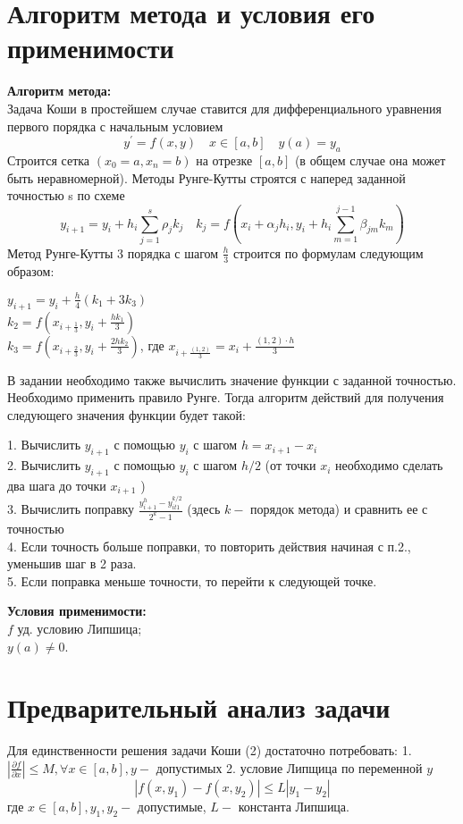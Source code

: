 \documentclass[12pt]{article}
\begin{document}
\section{Алгоритм метода и условия его применимости} 
\textbf{Алгоритм метода:} \\ 
Задача Коши в простейшем случае ставится для дифференциального уравнения первого порядка с начальным условием
$$
y^{\prime}=f(x, y) \quad x \in[a, b] \quad y(a)=y_{a}
$$
Строится сетка $\left(x_{0}=a, x_{n}=b\right)$ на отрезке $[a, b]$ (в общем случае она может быть неравномерной). Методы Рунге-Кутты строятся с наперед заданной точностью s по схеме
$$
y_{i+1}=y_{i}+h_{i} \sum_{j=1}^{s} \rho_{j} k_{j} \quad k_{j}=f\left(x_{i}+\alpha_{j} h_{i}, y_{i}+h_{i} \sum_{m=1}^{j-1} \beta_{j m} k_{m}\right)
$$
Метод Рунге-Кутты 3 порядка с шагом $\frac{h}{3}$ строится по формулам следующим образом:\\
\begin{center}
$y_{i+1}=y_{i}+\frac{h}{4}(k_1 + 3k_3)$\\
$k_{2}=f\left(x_{i+\frac{1}{3}}, y_{i}+\frac{h k_{1}}{3}\right)$\\
$k_{3}=f\left(x_{i+\frac{2}{3}}, y_{i}+\frac{2 h k_{2}}{3}\right)$, где $x_{i+\frac{(1,2)}{3}} = x_i + \frac{{(1,2)}\cdot h }{3}$

\end{center}
В задании необходимо также вычислить значение функции с заданной точностью. Необходимо применить правило Рунге. Тогда алгоритм действий для получения следующего значения функции будет такой:
\begin{flushleft}
1. Вычислить $y_{i+1}$ с помощью $y_{i}$ с шагом $h=x_{i+1}-x_{i}$\\
2. Вычислить $y_{i+1}$ с помощью $y_{i}$ с шагом $h / 2$ (от точки $x_{i}$ необходимо сделать два шага до точки $x_{i+1}$ )\\
3. Вычислить поправку $\frac{y_{i+1}^{h}-y_{i t 1}^{k / 2}}{2^{k}-1}$ (здесь $k-$ порядок метода) и сравнить ее с точностью\\
4. Если точность больше поправки, то повторить действия начиная с п.2., уменьшив шаг в 2 раза.\\
5. Если поправка меньше точности, то перейти к следующей точке.
\end{flushleft}
\textbf{Условия применимости:}\\
$f$ уд. условию Липшица;\\
$y(a) \neq 0$.
\section{Предварительный анализ задачи}
Для единственности решения задачи Коши (2) достаточно потребовать:
1. $\left|\frac{\partial f}{\partial x}\right| \leq M, \forall x \in[a, b], y-$ допустимых
2. условие Липщица по переменной $y$
$$
\left|f\left(x, y_{1}\right)-f\left(x, y_{2}\right)\right| \leq L\left|y_{1}-y_{2}\right|
$$
где $x \in[a, b], y_{1}, y_{2}-$ допустимые, $L-$ константа Липшица.
\end{document}
